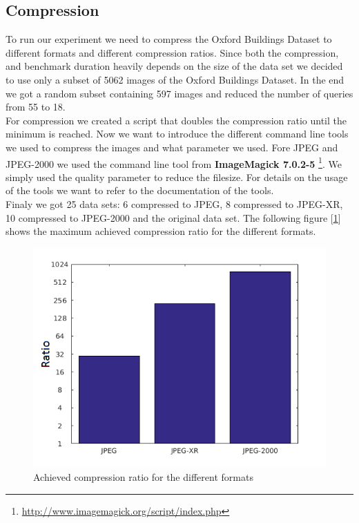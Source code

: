 \documentclass[10pt,a4paper]{article}
\begin{document}
\subsection{Compression}
To run our experiment we need to compress the Oxford Buildings Dataset to different formats and different compression ratios. Since both the compression, and benchmark duration heavily depends on the size of the data set we decided to use only a subset of 5062 images of the Oxford Buildings Dataset. In the end we got a random subset containing 597 images and reduced the number of queries from 55 to 18.\\
For compression we created a script that doubles the compression ratio until the minimum is reached. Now we want to introduce the different command line tools we used to compress the images and what parameter we used.
Fore JPEG and JPEG-2000 we used the command line tool from \textbf{ImageMagick 7.0.2-5} \footnote{\url{http://www.imagemagick.org/script/index.php}}. We simply used the quality parameter to reduce the filesize.
For details on the usage of the tools we want to refer to the documentation of the tools.\\
Finaly we got 25 data sets: 6 compressed to JPEG, 8 compressed to JPEG-XR, 10 compressed to JPEG-2000 and the original data set. The following figure [\ref{fig:compression}] shows the maximum achieved compression ratio for the different formats.\\
\begin{figure}[!htp]
\includegraphics[width=\textwidth]{img/compression.png}
	\caption{Achieved compression ratio for the different formats}
  \label{fig:compression}
\end{figure}
\end{document}
